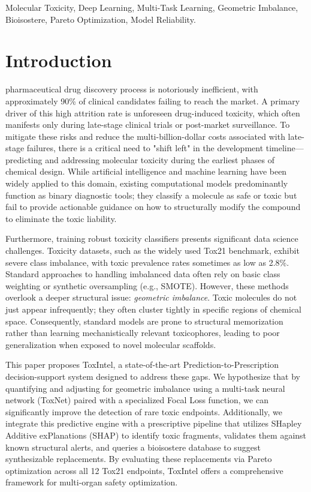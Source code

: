 \documentclass[lettersize,journal]{IEEEtran}
\begin{document}
\begin{IEEEkeywords}
Molecular Toxicity, Deep Learning, Multi-Task Learning, Geometric Imbalance, Bioisostere, Pareto Optimization, Model Reliability.
\end{IEEEkeywords}

\section{Introduction}
 pharmaceutical drug discovery process is notoriously inefficient, with approximately 90\% of clinical candidates failing to reach the market. A primary driver of this high attrition rate is unforeseen drug-induced toxicity, which often manifests only during late-stage clinical trials or post-market surveillance. To mitigate these risks and reduce the multi-billion-dollar costs associated with late-stage failures, there is a critical need to "shift left" in the development timeline—predicting and addressing molecular toxicity during the earliest phases of chemical design. While artificial intelligence and machine learning have been widely applied to this domain, existing computational models predominantly function as binary diagnostic tools; they classify a molecule as safe or toxic but fail to provide actionable guidance on how to structurally modify the compound to eliminate the toxic liability.

Furthermore, training robust toxicity classifiers presents significant data science challenges. Toxicity datasets, such as the widely used Tox21 benchmark, exhibit severe class imbalance, with toxic prevalence rates sometimes as low as 2.8\%. Standard approaches to handling imbalanced data often rely on basic class weighting or synthetic oversampling (e.g., SMOTE). However, these methods overlook a deeper structural issue: \textit{geometric imbalance}. Toxic molecules do not just appear infrequently; they often cluster tightly in specific regions of chemical space. Consequently, standard models are prone to structural memorization rather than learning mechanistically relevant toxicophores, leading to poor generalization when exposed to novel molecular scaffolds.

This paper proposes ToxIntel, a state-of-the-art Prediction-to-Prescription decision-support system designed to address these gaps. We hypothesize that by quantifying and adjusting for geometric imbalance using a multi-task neural network (ToxNet) paired with a specialized Focal Loss function, we can significantly improve the detection of rare toxic endpoints. Additionally, we integrate this predictive engine with a prescriptive pipeline that utilizes SHapley Additive exPlanations (SHAP) to identify toxic fragments, validates them against known structural alerts, and queries a bioisostere database to suggest synthesizable replacements. By evaluating these replacements via Pareto optimization across all 12 Tox21 endpoints, ToxIntel offers a comprehensive framework for multi-organ safety optimization.
\end{document}
